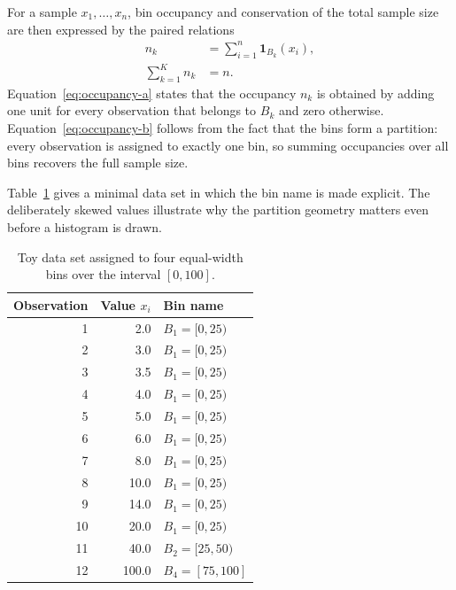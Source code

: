 For a sample $x_1,\ldots,x_n$, bin occupancy and conservation of the total sample size are then expressed by the paired relations
\begin{subequations}\label{eq:occupancy}
\begin{align}
 n_k &= \sum_{i=1}^{n}\mathbf{1}_{B_k}(x_i),
 \label{eq:occupancy-a}\\
 \sum_{k=1}^{K} n_k &= n.
 \label{eq:occupancy-b}
\end{align}
\end{subequations}
Equation~\eqref{eq:occupancy-a} states that the occupancy $n_k$ is obtained by adding one unit for every observation that belongs to $B_k$ and zero otherwise. Equation~\eqref{eq:occupancy-b} follows from the fact that the bins form a partition: every observation is assigned to exactly one bin, so summing occupancies over all bins recovers the full sample size.

Table~\ref{tab:toy-binning} gives a minimal data set in which the bin name is made explicit. The deliberately skewed values illustrate why the partition geometry matters even before a histogram is drawn.

\begin{table}[htbp]
\centering
\caption{Toy data set assigned to four equal-width bins over the interval $[0,100]$.}
\label{tab:toy-binning}
\begin{tabular}{rrl}
\toprule
Observation & Value $x_i$ & Bin name \\
\midrule
1 & 2.0 & $B_1=[0,25)$ \\
2 & 3.0 & $B_1=[0,25)$ \\
3 & 3.5 & $B_1=[0,25)$ \\
4 & 4.0 & $B_1=[0,25)$ \\
5 & 5.0 & $B_1=[0,25)$ \\
6 & 6.0 & $B_1=[0,25)$ \\
7 & 8.0 & $B_1=[0,25)$ \\
8 & 10.0 & $B_1=[0,25)$ \\
9 & 14.0 & $B_1=[0,25)$ \\
10 & 20.0 & $B_1=[0,25)$ \\
11 & 40.0 & $B_2=[25,50)$ \\
12 & 100.0 & $B_4=[75,100]$ \\
\bottomrule
\end{tabular}
\end{table}

